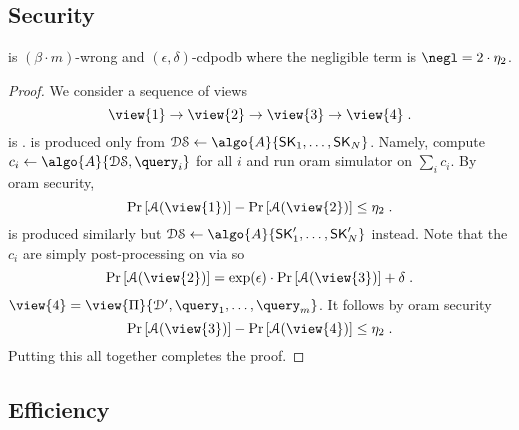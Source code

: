 		

	\subsection{Security}

		\begin{theorem}
			\epsolute{} is $(\beta \cdot m)$-wrong and $(\epsilon, \delta)$-\acrshort{cdpodb} where the negligible term is $\negl = 2 \cdot \eta_2$.
		\end{theorem}

		\begin{proof}
			We consider a sequence of views
			\[
				\view{1} \to \view{2} \to \view{3} \to \view{4} \; .
			\]
			 is .
			 is produced only from $\serverDS \gets \algo{A}{\fromNtoM{\searchKey}{1}{\domainSize}}$.
			Namely, compute $c_i \gets \algo{A}{\serverDS, \query_i}$ for all $i$ and run \acrshort{oram} simulator on $\sum_i c_i$.
			By \acrshort{oram} security,
			\[
				\probability{\adversary(\view{1})} - \probability{\adversary(\view{2})} \leq \eta_2 \; .
			\]
			 is produced similarly but $\serverDS \gets \algo{A}{\fromNtoM{\searchKey^\prime}{1}{\domainSize}}$ instead.
			Note that the $c_i$ are simply post-processing on \serverDS{} via  so
			\[
				\probability{\adversary(\view{2})} = \exp(\epsilon) \cdot \probability{\adversary(\view{3})} + \delta \; .
			\]
			$\view{4} = \view{\protocol}{\database^\prime, \fromNtoM{\query}{1}{m}}$.
			It follows by \acrshort{oram} security
			\[
				\probability{\adversary(\view{3})} - \probability{\adversary(\view{4})} \leq \eta_2 \; .
			\]
			Putting this all together completes the proof.
		\end{proof}

	\subsection{Efficiency}

